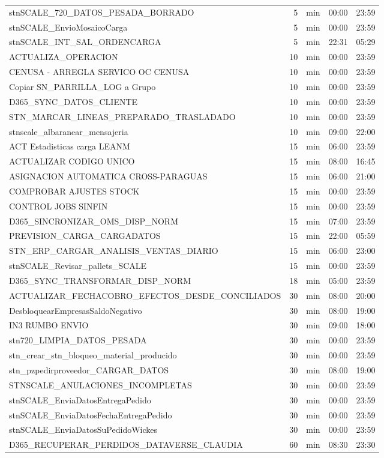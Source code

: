 \documentclass[11pt,a4paper]{article}
\begin{document}
\begin{longtable}{p{8.3cm}rp{1.2cm}p{1.5cm}p{1.5cm}}
stnSCALE\_720\_DATOS\_PESADA\_BORRADO & 5 & min & 00:00 & 23:59 \\
stnSCALE\_EnvioMosaicoCarga & 5 & min & 00:00 & 23:59 \\
stnSCALE\_INT\_SAL\_ORDENCARGA & 5 & min & 22:31 & 05:29 \\
ACTUALIZA\_OPERACION & 10 & min & 00:00 & 23:59 \\
CENUSA - ARREGLA SERVICO OC CENUSA & 10 & min & 00:00 & 23:59 \\
Copiar SN\_PARRILLA\_LOG a Grupo & 10 & min & 00:00 & 23:59 \\
D365\_SYNC\_DATOS\_CLIENTE & 10 & min & 00:00 & 23:59 \\
STN\_MARCAR\_LINEAS\_PREPARADO\_TRASLADADO & 10 & min & 00:00 & 23:59 \\
stnscale\_albaranear\_mensajeria & 10 & min & 09:00 & 22:00 \\
ACT Estadisticas carga LEANM & 15 & min & 06:00 & 23:59 \\
ACTUALIZAR CODIGO UNICO & 15 & min & 08:00 & 16:45 \\
ASIGNACION AUTOMATICA CROSS-PARAGUAS & 15 & min & 06:00 & 21:00 \\
COMPROBAR AJUSTES STOCK & 15 & min & 00:00 & 23:59 \\
CONTROL JOBS SINFIN & 15 & min & 00:00 & 23:59 \\
D365\_SINCRONIZAR\_OMS\_DISP\_NORM & 15 & min & 07:00 & 23:59 \\
PREVISION\_CARGA\_CARGADATOS & 15 & min & 22:00 & 05:59 \\
STN\_ERP\_CARGAR\_ANALISIS\_VENTAS\_DIARIO & 15 & min & 06:00 & 23:00 \\
stnSCALE\_Revisar\_pallets\_SCALE & 15 & min & 00:00 & 23:59 \\
D365\_SYNC\_TRANSFORMAR\_DISP\_NORM & 18 & min & 05:00 & 23:59 \\
ACTUALIZAR\_FECHACOBRO\_EFECTOS\_DESDE\_CONCILIADOS & 30 & min & 08:00 & 20:00 \\
DesbloquearEmpresasSaldoNegativo & 30 & min & 08:00 & 19:00 \\
IN3 RUMBO ENVIO & 30 & min & 09:00 & 18:00 \\
stn720\_LIMPIA\_DATOS\_PESADA & 30 & min & 00:00 & 23:59 \\
stn\_crear\_stn\_bloqueo\_material\_producido & 30 & min & 00:00 & 23:59 \\
stn\_pzpedirproveedor\_CARGAR\_DATOS & 30 & min & 08:00 & 19:00 \\
STNSCALE\_ANULACIONES\_INCOMPLETAS & 30 & min & 00:00 & 23:59 \\
stnSCALE\_EnviaDatosEntregaPedido & 30 & min & 00:00 & 23:59 \\
stnSCALE\_EnviaDatosFechaEntregaPedido & 30 & min & 00:00 & 23:59 \\
stnSCALE\_EnviaDatosSuPedidoWickes & 30 & min & 00:00 & 23:59 \\
D365\_RECUPERAR\_PERDIDOS\_DATAVERSE\_CLAUDIA & 60 & min & 08:30 & 23:30 \\
\bottomrule
\end{longtable}
\end{document}
